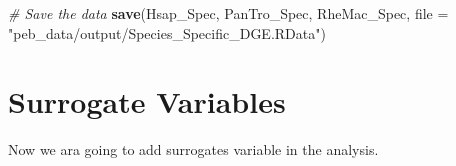 \documentclass[]{book}
\newenvironment{Shaded}{\begin{snugshade}}{\end{snugshade}}
\newcommand{\CommentTok}[1]{\textcolor[rgb]{0.56,0.35,0.01}{\textit{#1}}}
\newcommand{\DataTypeTok}[1]{\textcolor[rgb]{0.13,0.29,0.53}{#1}}
\newcommand{\KeywordTok}[1]{\textcolor[rgb]{0.13,0.29,0.53}{\textbf{#1}}}
\newcommand{\NormalTok}[1]{#1}
\newcommand{\StringTok}[1]{\textcolor[rgb]{0.31,0.60,0.02}{#1}}
\begin{document}
\begin{Shaded}
\begin{Highlighting}[]

\CommentTok{# Save the data}
\KeywordTok{save}\NormalTok{(Hsap_Spec, PanTro_Spec, RheMac_Spec, }\DataTypeTok{file =} \StringTok{"peb_data/output/Species_Specific_DGE.RData"}\NormalTok{)}
\end{Highlighting}
\end{Shaded}

\hypertarget{surrogate-variables}{%
\section{Surrogate Variables}\label{surrogate-variables}}

Now we ara going to add surrogates variable in the analysis.
\end{document}
